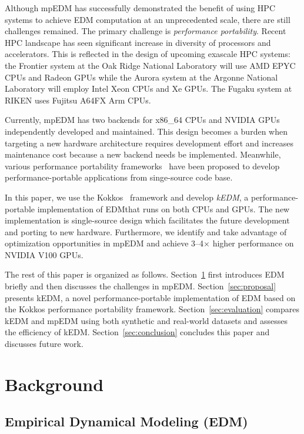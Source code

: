 \documentclass[sigconf]{acmart}
\begin{document}
Although mpEDM has successfully demonstrated the benefit of using HPC systems
to achieve EDM computation at an unprecedented scale, there are still
challenges remained. The primary challenge is \textit{performance portability}.
Recent HPC landscape has seen significant increase in diversity of processors
and accelerators. This is reflected in the design of upcoming exascale HPC
systems: the Frontier system at the Oak Ridge National Laboratory will use AMD
EPYC CPUs and Radeon GPUs while the Aurora system at the Argonne National
Laboratory will employ Intel Xeon CPUs and Xe GPUs. The Fugaku system at RIKEN
uses Fujitsu A64FX Arm CPUs.

Currently, mpEDM has two backends for x86\_64 CPUs and NVIDIA GPUs
independently developed and maintained. This design becomes a burden when
targeting a new hardware architecture requires development effort and
increases maintenance cost because a new backend needs be implemented.
Meanwhile, various performance portability frameworks~\cite{Deakin2019,
Deakin2020} have been proposed to develop performance-portable applications
from singe-source code base.

In this paper, we use the Kokkos~\cite{Edwards2014} framework and develop
\textit{kEDM}, a performance-portable implementation of EDM\@ that runs on
both CPUs and GPUs. The new implementation is single-source design which
facilitates the future development and porting to new hardware. Furthermore,
we identify and take advantage of optimization opportunities in mpEDM and
achieve 3--4$\times$ higher performance on NVIDIA V100 GPUs.

The rest of this paper is organized as follows. Section~\ref{sec:background}
first introduces EDM briefly and then discusses the challenges in mpEDM\@.
Section~\ref{sec:proposal} presents kEDM, a novel performance-portable
implementation of EDM based on the Kokkos performance portability framework.
Section~\ref{sec:evaluation} compares kEDM and mpEDM using both synthetic and
real-world datasets and assesses the efficiency of kEDM\@.
Section~\ref{sec:conclusion} concludes this paper and discusses future work.

\section{Background}\label{sec:background}

\subsection{Empirical Dynamical Modeling (EDM)}\label{sec:edm}
\end{document}
